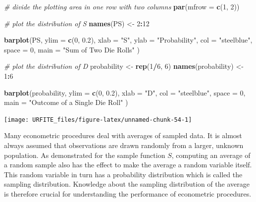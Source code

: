 \documentclass[]{book}
\newenvironment{Shaded}{\begin{snugshade}}{\end{snugshade}}
\newcommand{\KeywordTok}[1]{\textcolor[rgb]{0.13,0.29,0.53}{\textbf{#1}}}
\newcommand{\DataTypeTok}[1]{\textcolor[rgb]{0.13,0.29,0.53}{#1}}
\newcommand{\DecValTok}[1]{\textcolor[rgb]{0.00,0.00,0.81}{#1}}
\newcommand{\FloatTok}[1]{\textcolor[rgb]{0.00,0.00,0.81}{#1}}
\newcommand{\StringTok}[1]{\textcolor[rgb]{0.31,0.60,0.02}{#1}}
\newcommand{\CommentTok}[1]{\textcolor[rgb]{0.56,0.35,0.01}{\textit{#1}}}
\newcommand{\OperatorTok}[1]{\textcolor[rgb]{0.81,0.36,0.00}{\textbf{#1}}}
\newcommand{\NormalTok}[1]{#1}
\theoremstyle{definition}
\theoremstyle{definition}
\theoremstyle{definition}
\theoremstyle{remark}
\begin{document}
\begin{Shaded}
\begin{Highlighting}[]
\CommentTok{# divide the plotting area in one row with two columns}
\KeywordTok{par}\NormalTok{(}\DataTypeTok{mfrow =} \KeywordTok{c}\NormalTok{(}\DecValTok{1}\NormalTok{, }\DecValTok{2}\NormalTok{))}

\CommentTok{# plot the distribution of S}
\KeywordTok{names}\NormalTok{(PS) <-}\StringTok{ }\DecValTok{2}\OperatorTok{:}\DecValTok{12}

\KeywordTok{barplot}\NormalTok{(PS, }\DataTypeTok{ylim =} \KeywordTok{c}\NormalTok{(}\DecValTok{0}\NormalTok{, }\FloatTok{0.2}\NormalTok{), }
        \DataTypeTok{xlab =} \StringTok{"S"}\NormalTok{, }
        \DataTypeTok{ylab =} \StringTok{"Probability"}\NormalTok{, }
        \DataTypeTok{col =} \StringTok{"steelblue"}\NormalTok{, }
        \DataTypeTok{space =} \DecValTok{0}\NormalTok{, }
        \DataTypeTok{main =} \StringTok{"Sum of Two Die Rolls"}
\NormalTok{        )}

\CommentTok{# plot the distribution of D }
\NormalTok{probability <-}\StringTok{ }\KeywordTok{rep}\NormalTok{(}\DecValTok{1}\OperatorTok{/}\DecValTok{6}\NormalTok{, }\DecValTok{6}\NormalTok{)}
\KeywordTok{names}\NormalTok{(probability) <-}\StringTok{ }\DecValTok{1}\OperatorTok{:}\DecValTok{6}

\KeywordTok{barplot}\NormalTok{(probability, }
        \DataTypeTok{ylim =} \KeywordTok{c}\NormalTok{(}\DecValTok{0}\NormalTok{, }\FloatTok{0.2}\NormalTok{), }
        \DataTypeTok{xlab =} \StringTok{"D"}\NormalTok{, }
        \DataTypeTok{col =} \StringTok{"steelblue"}\NormalTok{, }
        \DataTypeTok{space =} \DecValTok{0}\NormalTok{, }
        \DataTypeTok{main =} \StringTok{"Outcome of a Single Die Roll"}
\NormalTok{        )}
\end{Highlighting}
\end{Shaded}

\begin{center}\texttt{[image: URFITE\_files/figure-latex/unnamed-chunk-54-1]} \end{center}

Many econometric procedures deal with averages of sampled data. It is
almost always assumed that observations are drawn randomly from a
larger, unknown population. As demonstrated for the sample function
\(S\), computing an average of a random sample also has the effect to
make the average a random variable itself. This random variable in turn
has a probability distribution which is called the sampling
distribution. Knowledge about the sampling distribution of the average
is therefore crucial for understanding the performance of econometric
procedures.
\end{document}
